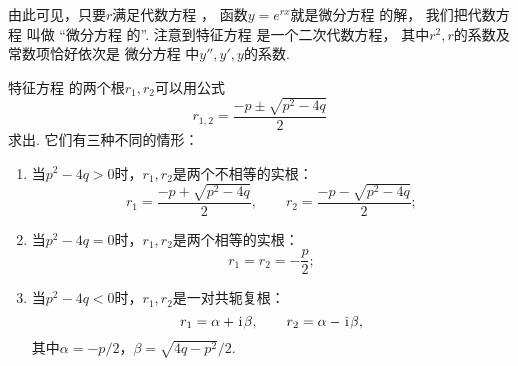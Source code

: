 由此可见，只要\(r\)满足代数方程 ，
函数\(y = e^{rx}\)就是微分方程  的解，
我们把代数方程  叫做
“微分方程  的”.
注意到特征方程  是一个二次代数方程，
其中\(r^2, r\)的系数及常数项恰好依次是
微分方程  中\(y'',y',y\)的系数.

特征方程  的两个根\(r_1,r_2\)可以用公式\begin{equation*}
r_{1,2} = \frac{-p \pm\sqrt{p^2-4q}}{2}
\end{equation*}求出.
它们有三种不同的情形：\begin{enumerate}
	\item 当\(p^2-4q>0\)时，\(r_1,r_2\)是两个不相等的实根：\begin{equation*}
		r_1 = \frac{-p +\sqrt{p^2-4q}}{2}, \qquad
		r_2 = \frac{-p -\sqrt{p^2-4q}}{2};
	\end{equation*}
	\item 当\(p^2-4q=0\)时，\(r_1,r_2\)是两个相等的实根：\begin{equation*}
		r_1 = r_2 = -\frac{p}{2};
	\end{equation*}
	\item 当\(p^2-4q<0\)时，\(r_1,r_2\)是一对共轭复根：\begin{equation*}
		r_1 = \alpha+\kern1pt\mathrm{i}\kern1pt\beta, \qquad r_2 = \alpha-\kern1pt\mathrm{i}\kern1pt\beta,
	\end{equation*}
	其中\(\alpha=-p/2\)，\(\beta=\sqrt{4q-p^2}/2\).
\end{enumerate}

